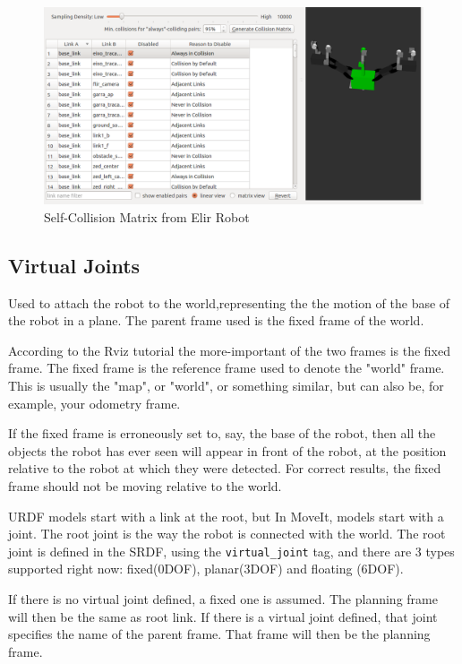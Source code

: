 \documentclass[12pt, a4paper, oneside]{article}
\begin{document}
	\begin{figure}[h]
		\centering
		\includegraphics[width=1\textwidth]{self_collision.png}
		\caption{Self-Collision Matrix from Elir Robot}
		\label{fig:collision}
	\end{figure}
	
	
	\subsection{Virtual Joints}
	Used to attach the robot to the world,representing the the motion of the base of the robot in a plane. The parent frame used is the fixed frame of the world.
	
	According to the Rviz tutorial the more-important of the two frames is the fixed frame. The fixed frame is the reference frame used to denote the "world" frame. This is usually the "map", or "world", or something similar, but can also be, for example, your odometry frame.\cite{rviz_site}
	 
	If the fixed frame is erroneously set to, say, the base of the robot, then all the objects the robot has ever seen will appear in front of the robot, at the position relative to the robot at which they were detected. For correct results, the fixed frame should not be moving relative to the world.\cite{rviz_site}
	
	URDF models start with a link at the root, but In MoveIt, models start with a joint. The root joint is the way the robot is connected with the world. The root joint is defined in the SRDF, using the \verb|virtual_joint| tag, and there are 3 types supported right now: fixed(0DOF), planar(3DOF) and floating (6DOF).\cite{moveit}
	
	If there is no virtual joint defined, a fixed one is assumed. The planning frame will then be the same as root link.
	If there is a virtual joint defined, that joint specifies the name of the parent frame. That frame will then be the planning frame. \cite{moveit}
	
\end{document}
